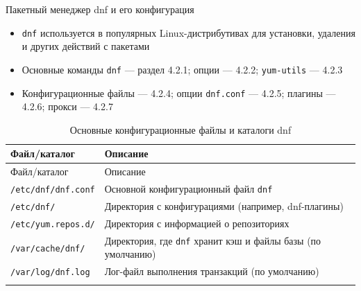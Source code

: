 \documentclass[
  ignorenonframetext,
  aspectratio=169,
  russian,
]{beamer}
\providecommand{\tightlist}{%
  \setlength{\itemsep}{0pt}\setlength{\parskip}{0pt}}
\begin{document}
\begin{frame}[fragile]{Пакетный менеджер dnf и его конфигурация}
\protect{}\label{ux43fux430ux43aux435ux442ux43dux44bux439-ux43cux435ux43dux435ux434ux436ux435ux440-dnf-ux438-ux435ux433ux43e-ux43aux43eux43dux444ux438ux433ux443ux440ux430ux446ux438ux44f}
\begin{itemize}[<+->]
\tightlist
\item
  \texttt{dnf} используется в популярных Linux-дистрибутивах для
  установки, удаления и других действий с пакетами
\item
  Основные команды \texttt{dnf} --- раздел 4.2.1; опции --- 4.2.2;
  \texttt{yum-utils} --- 4.2.3
\item
  Конфигурационные файлы --- 4.2.4; опции \texttt{dnf.conf} --- 4.2.5;
  плагины --- 4.2.6; прокси --- 4.2.7
\end{itemize}

\begin{longtable}[]{@{}
  >{\raggedright\arraybackslash}p{}
  >{\raggedright\arraybackslash}p{}@{}}
\caption{Основные конфигурационные файлы и каталоги
dnf}\label{tbl-dnf-files}\tabularnewline
\toprule\noalign{}
\begin{minipage}[b]{\linewidth}\raggedright
Файл/каталог
\end{minipage} & \begin{minipage}[b]{\linewidth}\raggedright
Описание
\end{minipage} \\
\midrule\noalign{}
\endfirsthead
\toprule\noalign{}
\begin{minipage}[b]{\linewidth}\raggedright
Файл/каталог
\end{minipage} & \begin{minipage}[b]{\linewidth}\raggedright
Описание
\end{minipage} \\
\midrule\noalign{}
\endhead
\texttt{/etc/dnf/dnf.conf} & Основной конфигурационный файл
\texttt{dnf} \\
\texttt{/etc/dnf/} & Директория с конфигурациями (например,
dnf-плагины) \\
\texttt{/etc/yum.repos.d/} & Директория с информацией о репозиториях \\
\texttt{/var/cache/dnf/} & Директория, где \texttt{dnf} хранит кэш и
файлы базы (по умолчанию) \\
\texttt{/var/log/dnf.log} & Лог-файл выполнения транзакций (по
умолчанию) \\
\bottomrule\noalign{}
\end{longtable}
\end{frame}
\end{document}
